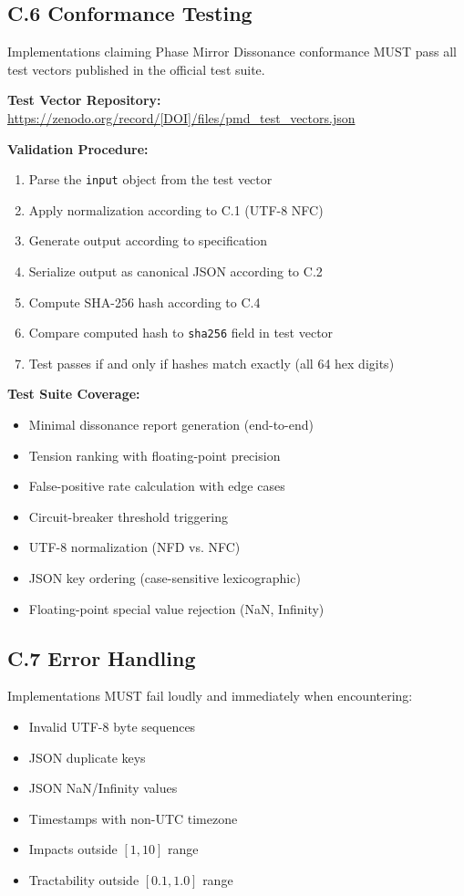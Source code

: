 \documentclass[11pt,a4paper]{article}
\begin{document}
\subsection*{C.6 Conformance Testing}

Implementations claiming Phase Mirror Dissonance conformance MUST pass all test vectors published in the official test suite.

\textbf{Test Vector Repository:} \\
\url{https://zenodo.org/record/[DOI]/files/pmd_test_vectors.json}

\textbf{Validation Procedure:}
\begin{enumerate}
\item Parse the \texttt{input} object from the test vector
\item Apply normalization according to C.1 (UTF-8 NFC)
\item Generate output according to specification
\item Serialize output as canonical JSON according to C.2
\item Compute SHA-256 hash according to C.4
\item Compare computed hash to \texttt{sha256} field in test vector
\item Test passes if and only if hashes match exactly (all 64 hex digits)
\end{enumerate}

\textbf{Test Suite Coverage:}
\begin{itemize}
\item Minimal dissonance report generation (end-to-end)
\item Tension ranking with floating-point precision
\item False-positive rate calculation with edge cases
\item Circuit-breaker threshold triggering
\item UTF-8 normalization (NFD vs. NFC)
\item JSON key ordering (case-sensitive lexicographic)
\item Floating-point special value rejection (NaN, Infinity)
\end{itemize}

\subsection*{C.7 Error Handling}

Implementations MUST fail loudly and immediately when encountering:
\begin{itemize}
\item Invalid UTF-8 byte sequences
\item JSON duplicate keys
\item JSON NaN/Infinity values
\item Timestamps with non-UTC timezone
\item Impacts outside $[1, 10]$ range
\item Tractability outside $[0.1, 1.0]$ range
\end{itemize}
\end{document}

